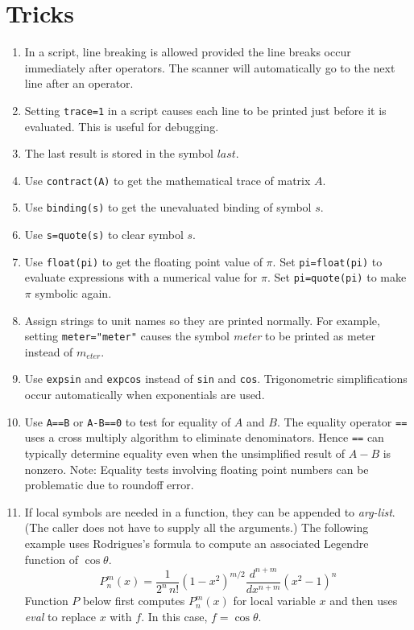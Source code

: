 \section{Tricks}
\begin{enumerate}

\item
In a script, line breaking is allowed provided the line breaks occur immediately after operators.
The scanner will automatically go to the next line after an operator.

\item
Setting \verb$trace=1$ in a script causes each line to be printed just before it is evaluated.
This is useful for debugging.

\item
The last result is stored in the symbol $last$.

\item
Use \verb$contract(A)$ to get the mathematical trace of matrix $A$.

\item
Use \verb$binding(s)$ to get the unevaluated binding of symbol $s$.

\item
Use \verb$s=quote(s)$ to clear symbol $s$.

\item
Use \verb$float(pi)$ to get the floating point value of $\pi$.
Set \verb$pi=float(pi)$ to evaluate expressions with a numerical value for $\pi$.
Set \verb$pi=quote(pi)$ to make $\pi$ symbolic again.

\item
Assign strings to unit names so they are printed normally.
For example, setting \verb$meter="meter"$ causes the symbol {\it meter}
to be printed as meter instead of $m_{eter}$.

\item
Use \verb$expsin$ and \verb$expcos$ instead of \verb$sin$ and \verb$cos$.
Trigonometric simplifications occur automatically when exponentials are used.

\item
Use \verb$A==B$ or \verb$A-B==0$ to test for equality of $A$ and $B$.
The equality operator \verb$==$ uses a cross multiply algorithm to eliminate denominators.
Hence \verb$==$ can typically determine equality even when the unsimplified result of $A-B$ is nonzero.
Note: Equality tests involving floating point numbers can be problematic
due to roundoff error.

\item
If local symbols are needed in a function, they can be appended to {\it arg-list}.
(The caller does not have to supply all the arguments.)
The following example uses Rodrigues's formula to
compute an associated Legendre function of $\cos\theta$.
\begin{equation*}
P_n^m(x)=\frac{1}{2^n\,n!}(1-x^2)^{m/2}\frac{d^{n+m}}{dx^{n+m}}(x^2-1)^n
\end{equation*}
Function $P$ below first computes $P_n^m(x)$ for local variable
$x$ and then uses {\it eval} to replace $x$ with $f$.
In this case, $f=\cos\theta$.


\end{enumerate}
